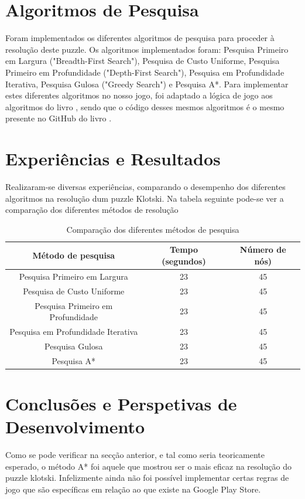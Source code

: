 \documentclass[conference]{IEEEtran}
\begin{document}
\section{Algoritmos de Pesquisa}
Foram implementados os diferentes algoritmos de pesquisa para proceder à resolução deste puzzle. Os algoritmos implementados foram: Pesquisa Primeiro em Largura ("Breadth-First Search"), Pesquisa de Custo Uniforme, Pesquisa Primeiro em Profundidade ("Depth-First Search"), Pesquisa em Profundidade Iterativa, Pesquisa Gulosa ("Greedy Search") e Pesquisa A*. Para implementar estes diferentes algoritmos no nosso jogo, foi adaptado a lógica de jogo aos algoritmos do livro \cite{b8}, sendo que o código desses mesmos algoritmos é o mesmo presente no GitHub do livro \cite{b9}.


\section{Experiências e Resultados}
Realizaram-se diversas experiências, comparando o desempenho dos diferentes algoritmos na resolução dum puzzle Klotski. Na tabela seguinte pode-se ver a comparação dos diferentes métodos de resolução

\begin{table}[htbp]
\caption{Comparação dos diferentes métodos de pesquisa}
\begin{center}
\begin{tabular}{|c|c|c|}
\hline
\textbf{Método de pesquisa} & \textbf{Tempo (segundos)} & \textbf{Número de nós)} \\
\hline
 Pesquisa Primeiro em Largura & 23 & 45\\
 Pesquisa de Custo Uniforme & 23 & 45 \\
 Pesquisa Primeiro em Profundidade & 23 & 45\\
 Pesquisa em Profundidade Iterativa & 23 & 45\\
 Pesquisa Gulosa & 23 & 45\\ 
 Pesquisa A* & 23 & 45\\
\hline

\end{tabular}
\label{tab1}
\end{center}
\end{table}


\section{Conclusões e Perspetivas de Desenvolvimento}
Como se pode verificar na secção anterior, e tal como seria teoricamente esperado, o método A* foi aquele que mostrou ser o mais eficaz na resolução do puzzle klotski. Infelizmente ainda não foi possível implementar certas regras de jogo que são específicas em relação ao que existe na Google Play Store.
\end{document}
